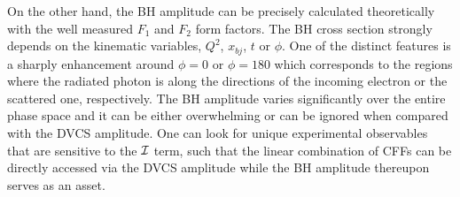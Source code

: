 On the other hand, the BH amplitude can be precisely calculated theoretically with the well measured $F_{1}$ and $F_{2}$ form factors. The BH cross section strongly depends on the kinematic variables, $Q^{2}$, $x_{bj}$, $t$ or $\phi$. One of the distinct features is a sharply enhancement around $\phi=0$ or $\phi=180$ which corresponds to the regions where the radiated photon is along the directions of the incoming electron or the scattered one, respectively. The BH amplitude varies significantly over the entire phase space and it can be either overwhelming or can be ignored when compared with the DVCS amplitude. One can look for unique experimental observables that are sensitive to the $\cal{I}$ term, such that the linear combination of CFFs can be directly accessed via the DVCS amplitude while the BH amplitude thereupon serves as an asset.

